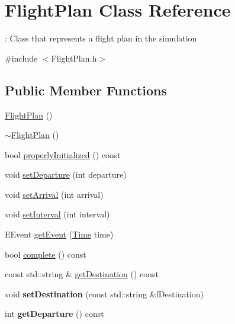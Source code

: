 \hypertarget{classFlightPlan}{}\section{Flight\+Plan Class Reference}
\label{classFlightPlan}


\+: Class that represents a flight plan in the simulation  




{\ttfamily \#include $<$Flight\+Plan.\+h$>$}

\subsection*{Public Member Functions}
\begin{DoxyCompactItemize}
\item 
\hyperlink{classFlightPlan_acc9140958ec2b86f78089067833f68fb}{Flight\+Plan} ()
\item 
\hyperlink{classFlightPlan_a674104757ac93924187fe1fc6bd7a342}{$\sim$\+Flight\+Plan} ()
\item 
bool \hyperlink{classFlightPlan_a6ba1f8f9cd4a738a437a3ec7ae283978}{properly\+Initialized} () const 
\item 
void \hyperlink{classFlightPlan_a54774b1bb6606e7b11359f23c2e4d79f}{set\+Departure} (int departure)
\item 
void \hyperlink{classFlightPlan_a1fad15b79c3463a21e8a89e6c42fda57}{set\+Arrival} (int arrival)
\item 
void \hyperlink{classFlightPlan_a157e8a456b078a125b64e20d6cd8bf58}{set\+Interval} (int interval)
\item 
E\+Event \hyperlink{classFlightPlan_a2350e5250fcc621240768e5dd7a7bdeb}{get\+Event} (\hyperlink{classTime}{Time} time)
\item 
bool \hyperlink{classFlightPlan_a28cda60a1a425003eb869a03b9f2b550}{complete} () const 
\item 
const std\+::string \& \hyperlink{classFlightPlan_add7c304a2be8ff8b6d08b6de28c1a4c6}{get\+Destination} () const 
\item 
void {\bfseries set\+Destination} (const std\+::string \&f\+Destination)\hypertarget{classFlightPlan_ab362a8718bf636c4c2e1738327879bed}{}\label{classFlightPlan_ab362a8718bf636c4c2e1738327879bed}

\item 
int {\bfseries get\+Departure} () const \hypertarget{classFlightPlan_a80708983bd926613c36041cf948c1224}{}\label{classFlightPlan_a80708983bd926613c36041cf948c1224}


\end{DoxyCompactItemize}
